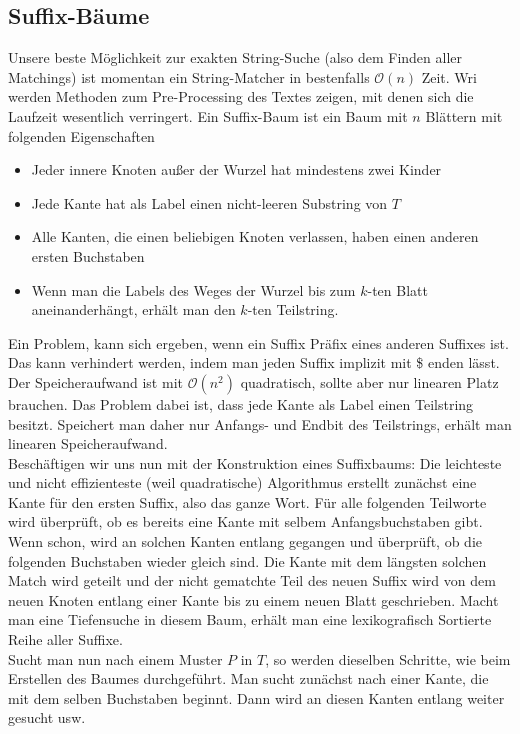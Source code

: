 \documentclass[a4paper, 12pt]{article}
\begin{document}
	\subsection{Suffix-Bäume}
	Unsere beste Möglichkeit zur exakten String-Suche (also dem Finden aller Matchings) ist momentan ein String-Matcher in bestenfalls $\mathcal{O}(n)$ Zeit. Wri werden Methoden zum Pre-Processing des Textes zeigen, mit denen sich die Laufzeit wesentlich verringert. Ein Suffix-Baum ist ein Baum mit $n$ Blättern mit folgenden Eigenschaften \begin{itemize}
		\item Jeder innere Knoten außer der Wurzel hat mindestens zwei Kinder
		\item Jede Kante hat als Label einen nicht-leeren Substring von $T$
		\item Alle Kanten, die einen beliebigen Knoten verlassen, haben einen anderen ersten Buchstaben
		\item Wenn man die Labels des Weges der Wurzel bis zum $k$-ten Blatt aneinanderhängt, erhält man den $k$-ten Teilstring. 
	\end{itemize}
	Ein Problem, kann sich ergeben, wenn ein Suffix Präfix eines anderen Suffixes ist. Das kann verhindert werden, indem man jeden Suffix implizit mit \$ enden lässt. Der Speicheraufwand ist mit $\mathcal{O}(n^2)$ quadratisch, sollte aber nur linearen Platz brauchen. Das Problem dabei ist, dass jede Kante als Label einen Teilstring besitzt. Speichert man daher nur Anfangs- und Endbit des Teilstrings, erhält man linearen Speicheraufwand.\\
	
	Beschäftigen wir uns nun mit der Konstruktion eines Suffixbaums: Die leichteste und nicht effizienteste (weil quadratische) Algorithmus erstellt zunächst eine Kante für den ersten Suffix, also das ganze Wort. Für alle folgenden Teilworte wird überprüft, ob es bereits eine Kante mit selbem Anfangsbuchstaben gibt. Wenn schon, wird an solchen Kanten entlang gegangen und überprüft, ob die folgenden Buchstaben wieder gleich sind. Die Kante mit dem längsten solchen Match wird geteilt und der nicht gematchte Teil des neuen Suffix wird von dem neuen Knoten entlang einer Kante bis zu einem neuen Blatt geschrieben. Macht man eine Tiefensuche in diesem Baum, erhält man eine lexikografisch Sortierte Reihe aller Suffixe.\\
	Sucht man nun nach einem Muster $P$ in $T$, so werden dieselben Schritte, wie beim Erstellen des Baumes durchgeführt. Man sucht zunächst nach einer Kante, die mit dem selben Buchstaben beginnt. Dann wird an diesen Kanten entlang weiter gesucht usw.
\end{document}
